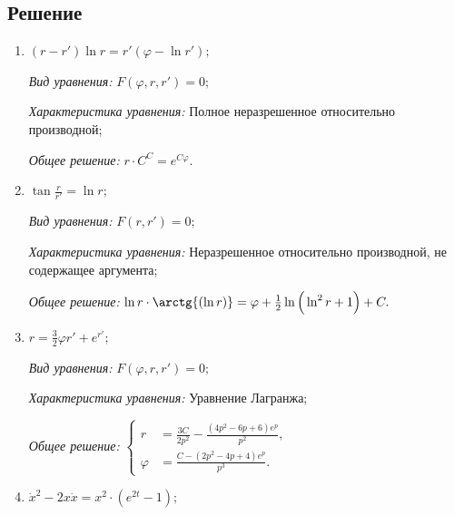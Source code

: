 \documentclass[14pt, a4paper, titlepage, fleqn]{extarticle}
\begin{document}
        \subsection{Решение}
            \begin{enumerate}
                \item \( (r-r') \ln{r} = r' \left( \varphi - \ln{r'} \right); \)
                
                    \textit{Вид уравнения:} \( F \left( \varphi, r, r' \right) = 0; \)

                    \textit{Характеристика уравнения:}
                        Полное неразрешенное относительно производной;

                    \textit{Общее решение:} \( r \cdot C^C = e^{C \varphi}. \)

                \item \( \tan{\frac{r}{r'}} = \ln{r}; \)
                
                    \textit{Вид уравнения:} \( F \left(r, r' \right) = 0; \)

                    \textit{Характеристика уравнения:}
                        Неразрешенное относительно производной, не содержащее аргумента;

                    \textit{Общее решение:} \( \ln{r} \cdot \arctg{\left( \ln r \right)} = \varphi + \frac{1}{2}\ln{\Big(\ln^2{r} + 1\Big)} + C. \)
                

                \item \( r = \frac{3}{2} \varphi r' + e^{r'}; \)
                
                    \textit{Вид уравнения:} \( F \left( \varphi, r, r' \right) = 0; \)

                    \textit{Характеристика уравнения:}
                        Уравнение Лагранжа;

                    \textit{Общее решение:} 
                        \(
                            \left\lbrace
                                \begin{aligned}
                                    r &= \frac{3C}{2p^2} - \frac{\left(4p^2 - 6p + 6\right) e^p}{p^2}, \\
                                    \varphi &= \frac{C - \left( 2p^2 - 4p + 4 \right)e^p}{p^3}.
                                \end{aligned}
                            \right.    
                        \)

                \item \( \dot{x}^2 - 2x \dot{x} = x^2 \cdot \left( e^{2t} - 1 \right); \)
                

\end{enumerate}
\end{document}
